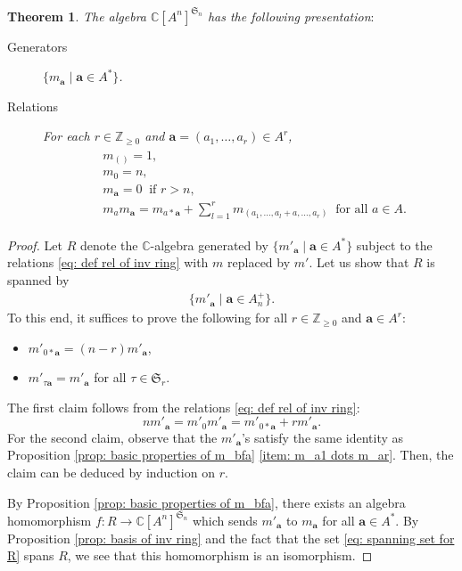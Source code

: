 \documentclass[12pt,a4paper]{amsart}
\newtheorem{thm}{Theorem}[subsection]
\theoremstyle{definition}
\numberwithin{equation}{subsection}
\begin{document}
\begin{thm}\label{thm: presentation of inv ring}
  The algebra $\mathbb{C}[A^n]^{\mathfrak{S}_n}$ has the following presentation$:$
  \begin{description}
    \item[Generators] $\{ m_\mathbf{a} \mid \mathbf{a} \in A^* \}$.
    \item[Relations] For each $r \in \mathbb{Z}_{\geq 0}$ and $\mathbf{a} = (a_1,\dots,a_r) \in A^r$,
    \begin{align}\label{eq: def rel of inv ring}
      \begin{split}
        &m_{()} = 1,\\
        &m_0 = n,\\
        &m_\mathbf{a} = 0 \ \text{ if } r > n,\\
        &m_a m_\mathbf{a} = m_{a*\mathbf{a}} + \sum_{l=1}^r m_{(a_1,\dots,a_l+a,\dots,a_r)} \ \text{ for all } a \in A.
      \end{split}
    \end{align}
  \end{description}
\end{thm}
\begin{proof}
  Let $R$ denote the $\mathbb{C}$-algebra generated by $\{ m'_\mathbf{a} \mid \mathbf{a} \in A^* \}$ subject to the relations \eqref{eq: def rel of inv ring} with $m$ replaced by $m'$.
  Let us show that $R$ is spanned by
  \begin{align}\label{eq: spanning set for R}
    \{ m'_{\mathbf{a}} \mid \mathbf{a} \in A_n^+ \}.
  \end{align}
  To this end, it suffices to prove the following for all $r \in \mathbb{Z}_{\geq 0}$ and $\mathbf{a} \in A^r$:
  \begin{itemize}
    \item $m'_{0*\mathbf{a}} = (n-r) m'_\mathbf{a}$,
    \item $m'_{\tau \mathbf{a}} = m'_\mathbf{a}$ for all $\tau \in \mathfrak{S}_r$.
  \end{itemize}
  The first claim follows from the relations \eqref{eq: def rel of inv ring}:
  \[
    n m'_\mathbf{a} = m'_0 m'_\mathbf{a} = m'_{0*\mathbf{a}} + rm'_\mathbf{a}.
  \]
  For the second claim, observe that the $m'_\mathbf{a}$'s satisfy the same identity as Proposition \ref{prop: basic properties of m_bfa} \eqref{item: m_a1 dots m_ar}. 
  Then, the claim can be deduced by induction on $r$.

  By Proposition \ref{prop: basic properties of m_bfa}, there exists an algebra homomorphism $f : R \to \mathbb{C}[A^n]^{\mathfrak{S}_n}$ which sends $m'_\mathbf{a}$ to $m_\mathbf{a}$ for all $\mathbf{a} \in A^*$.
  By Proposition \ref{prop: basis of inv ring} and the fact that the set \eqref{eq: spanning set for R} spans $R$, we see that this homomorphism is an isomorphism.
\end{proof}
\end{document}
